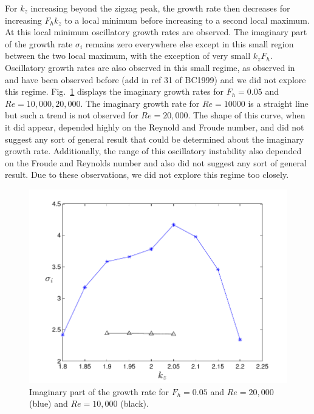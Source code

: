 For $k_{z}$ increasing beyond the zigzag peak, the growth rate then decreases for increasing $F_{h}k_{z}$ to a local minimum before increasing to a second local maximum. At this local minimum oscillatory growth rates are observed. The imaginary part of the growth rate $\sigma_{i}$ remains zero everywhere else except in this small region between the two local maximum, with the exception of very small $k_{z}F_{h}$. Oscillatory growth rates are also observed in this small regime, as observed in \cite{bc1999} and have been observed before \cite{bc1999} (add in ref 31 of BC1999) and we did not explore this regime. Fig.~\ref{oscillatory_growth} displays the imaginary growth rates for $F_{h}=0.05$ and $Re=10{,}000, 20{,}000$. The imaginary growth rate for $Re=10000$ is a straight line but such a trend is not observed for $Re=20{,}000$. The shape of this curve, when it did appear, depended highly on the Reynold and Froude number, and did not suggest any sort of general result that could be determined about the imaginary growth rate. Additionally, the range of this oscillatory instability also depended on the Froude and Reynolds number and also did not suggest any sort of general result. Due to these observations, we did not explore this regime too closely. 
\begin{figure}
\begin{center}
\includegraphics[scale=0.65]{oscillatory_growth}
\caption{Imaginary part of the growth rate for $F_{h}=0.05$ and $Re=20{,}000$ (blue) and $Re=10{,}000$ (black).}
\label{oscillatory_growth}
\end{center}
\end{figure} 

